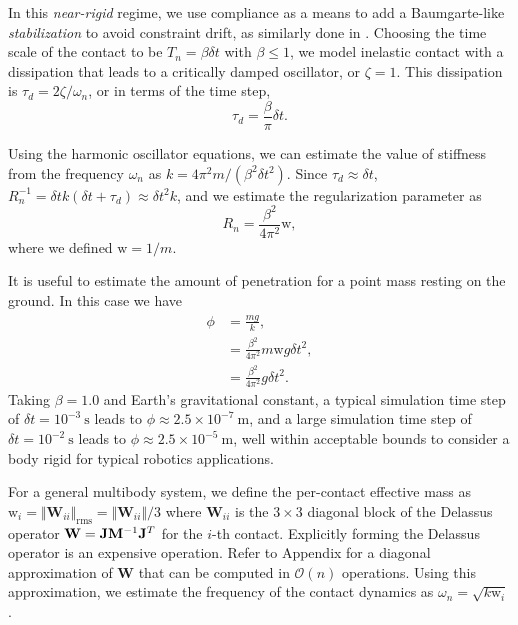 In this \emph{near-rigid} regime, we use compliance as a means to add a
Baumgarte-like \emph{stabilization} to avoid constraint drift, as similarly
done in \cite{bib:todorov2011}. Choosing the time scale of the contact to be
$T_n = \beta \delta t$ with $\beta \le 1$, we model inelastic contact with a dissipation
that leads to a critically damped oscillator, or $\zeta=1$. This dissipation is
$\tau_d=2\zeta/\omega_n$, or in terms of the time step,
\begin{equation*}
    \tau_d=\frac{\beta}{\pi}\delta t.
\end{equation*}

Using the harmonic oscillator equations, we can estimate the value of stiffness
from the frequency $\omega_n$ as $k=4\pi^2 m/(\beta^2 \delta t^2)$. Since
$\tau_d\approx\delta t$, $R_n^{-1} = \delta t k(\delta t+\tau_d) \approx \delta
t^2k$, and we estimate the regularization parameter as
\begin{equation*}
	R_n = \frac{\beta^2}{4\pi^2}\text{w},
\end{equation*}
where we defined $\text{w}=1/m$.

It is useful to estimate the amount of penetration for a point mass resting on
the ground. In this case we have
\begin{align*}
	\phi &= \frac{mg}{k}, \\
	&= \frac{\beta^2}{4\pi^2}m\text{w}g\delta t^2,\\
	&= \frac{\beta^2}{4\pi^2}g\delta t^2.
\end{align*}
Taking $\beta=1.0$ and Earth's gravitational constant, a typical simulation
time step of $\delta t=10^{-3}~\text{s}$ leads to $\phi\approx 2.5\times
10^{-7}~\text{m}$, and a large simulation time step of $\delta
t=10^{-2}~\text{s}$ leads to $\phi\approx 2.5\times 10^{-5}~\text{m}$, well
within acceptable bounds to consider a body rigid for typical robotics
applications.

For a general multibody system, we define the per-contact effective mass as
$\text{w}_i=\Vert\mathbf{W}_{ii}\Vert_\text{rms}=\Vert\mathbf{W}_{ii}\Vert/3$ where
$\mathbf{W}_{ii}$ is the $3\times 3$ diagonal block of the Delassus operator
$\mathbf{W}={\mathbf{J}}{\mathbf{M}}^{-1}{\mathbf{J}}^T$ for the $i$-th contact. Explicitly forming the Delassus
operator is an expensive operation. Refer to Appendix \RedHighlight{[O(n)
Approximation of W]} for a diagonal approximation of $\mathbf{W}$ that can be
computed in $\mathcal{O}(n)$ operations. Using this approximation, we estimate the
frequency of the contact dynamics as $\omega_n=\sqrt{k\text{w}_i}$.

